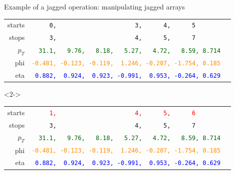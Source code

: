 \documentclass[aspectratio=169]{beamer}
\begin{document}
\begin{frame}[fragile]{Example of a jagged operation: manipulating jagged arrays}
\begin{onlyenv}
\begin{tabular}{r l}
\small starts  &                    {\tt\scriptsize \ \ \ \ \ 0,\ \ \ \ \ \ \ \ \ \ \ \ \ \ \ \ \ \ \ \ \ \ 3,\ \ \ \ \ \ 4,\ \ \ \ \ \ 5\ \ \ \ \ \ \ \ \ } \\
\small stops   &                    {\tt\scriptsize \ \ \ \ \ 3,\ \ \ \ \ \ \ \ \ \ \ \ \ \ \ \ \ \ \ \ \ \ 4,\ \ \ \ \ \ 5,\ \ \ \ \ \ 7\ \ \ \ \ \ \ \ \ } \\
\small $p_T$ & \textcolor{darkgreen}{\tt\scriptsize \ \ 31.1,\ \ \ 9.76,\ \ \ 8.18,\ \ \ 5.27,\ \ \ 4.72,\ \ \ 8.59, 8.714} \\
\small phi &  \textcolor{darkorange}{\tt\scriptsize -0.481,\ -0.123,\ -0.119,\ \ 1.246,\ -0.207,\ -1.754,\ 0.185} \\
\small eta &        \textcolor{blue}{\tt\scriptsize \ 0.882,\ \ 0.924,\ \ 0.923,\ -0.991,\ \ 0.953,\ -0.264,\ 0.629} \\
\end{tabular}
\end{onlyenv}\begin{onlyenv}<2->
\begin{tabular}{r l}
\small starts  &     \textcolor{red}{\tt\scriptsize \ \ \ \ \ 1,\ \ \ \ \ \ \ \ \ \ \ \ \ \ \ \ \ \ \ \ \ \ 4,\ \ \ \ \ \ 5,\ \ \ \ \ \ 6\ \ \ \ \ \ \ \ \ } \\
\small stops   &                    {\tt\scriptsize \ \ \ \ \ 3,\ \ \ \ \ \ \ \ \ \ \ \ \ \ \ \ \ \ \ \ \ \ 4,\ \ \ \ \ \ 5,\ \ \ \ \ \ 7\ \ \ \ \ \ \ \ \ } \\
\small $p_T$ & \textcolor{darkgreen}{\tt\scriptsize \ \ 31.1,\ \ \ 9.76,\ \ \ 8.18,\ \ \ 5.27,\ \ \ 4.72,\ \ \ 8.59, 8.714} \\
\small phi &  \textcolor{darkorange}{\tt\scriptsize -0.481,\ -0.123,\ -0.119,\ \ 1.246,\ -0.207,\ -1.754,\ 0.185} \\
\small eta &        \textcolor{blue}{\tt\scriptsize \ 0.882,\ \ 0.924,\ \ 0.923,\ -0.991,\ \ 0.953,\ -0.264,\ 0.629} \\
\end{tabular}\end{onlyenv}
\vspace{0.25 cm}

\large
{}

\vspace{0.25 cm}
\end{frame}
\end{document}
